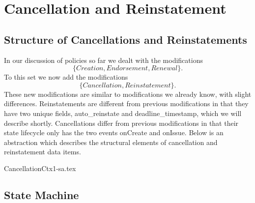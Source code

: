 \chapter{Cancellation and Reinstatement}
\label{intro} %


\section{Structure of Cancellations and Reinstatements}
\label{sec:02:1}
In our discussion of policies so far we dealt with the modifications
\begin{equation*}
  \{Creation, Endorsement, Renewal\}.
\end{equation*}
To this set we now
add the modifications
\begin{equation*}
  \{Cancellation, Reinstatement\}.
\end{equation*}
These new modifications are similar to modifications we already
know, with slight differences. Reinstatements are different from previous modifications in that they have two unique
fields, auto\_reinstate and deadline\_timestamp, which we will describe shortly. Cancellations differ from previous
modifications in that their state lifecycle only has the two events onCreate and onIssue. Below is an abstraction which
describes the structural elements of cancellation and reinstatement data items.

{CancellationCtx1-sa.tex}

\section{State Machine}

